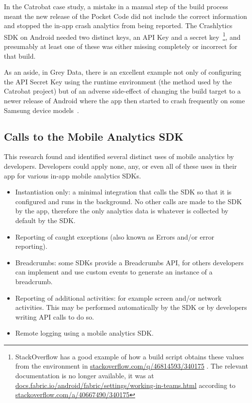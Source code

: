 In the Catrobat case study, a mistake in a manual step of the build process meant the new release of the Pocket Code did not include the correct information and stopped the in-app crash analytics from being reported. The Crashlytics SDK on Android needed two distinct keys, an API Key and a secret key~\footnote{StackOverflow has a good example of how a build script obtains these values from the environment in \href{https://stackoverflow.com/q/46814593/340175}{stackoverflow.com/q/46814593/340175}%
. 
The relevant documentation is no longer available, it was at \href{https://docs.fabric.io/android/fabric/settings/working-in-teams.html}{docs.fabric.io/android/fabric/settings/working-in-teams.html} according to \href{https://stackoverflow.com/a/40667490/340175}{stackoverflow.com/a/40667490/340175}}, and presumably at least one of these was either missing completely or incorrect for that build.

As an aside, in Grey Data, there is an excellent example not only of configuring the API Secret Key using the runtime environment (the method used by the Catrobat project) but of an adverse side-effect of changing the build target to a newer release of Android where the app then started to crash frequently on some Samsung device models~. 


\subsection{Calls to the Mobile Analytics SDK}
This research found and identified several distinct uses of mobile analytics by developers. Developers could apply none, any, or even all of these uses in their app for various in-app mobile analytics SDKs.

\begin{itemize}
    \item Instantiation only: a minimal integration that calls the SDK so that it is configured and runs in the background. No other calls are made to the SDK by the app, therefore the only analytics data is whatever is collected by default by the SDK.
    \item Reporting of caught exceptions (also known as Errors and/or error reporting). 
    \item Breadcrumbs: some SDKs provide a Breadcrumbs API, for others developers can implement and use custom events to generate an instance of a breadcrumb.
    \item Reporting of additional activities: for example screen and/or network activities. This may be performed automatically by the SDK or by developers writing API calls to do so.
    \item Remote logging using a mobile analytics SDK.
\end{itemize}

